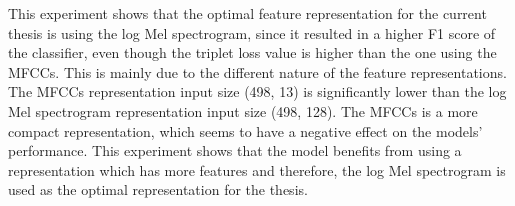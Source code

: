 \newline
\newline
This experiment shows that the optimal feature representation for the current thesis is using the log Mel spectrogram, since it resulted in a higher F1 score of the classifier, even though the triplet loss value is higher than the one using the \glspl{MFCC}. This is mainly due to the different nature of the feature representations. The \glspl{MFCC} representation input size (498, 13) is significantly lower than the log Mel spectrogram representation input size (498, 128). The \glspl{MFCC} is a more compact representation, which seems to have a negative effect on the models' performance. This experiment shows that the model benefits from using a representation which has more features and therefore, the log Mel spectrogram is used as the optimal representation for the thesis.

